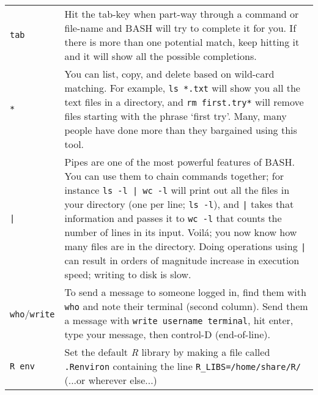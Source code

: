 \documentclass[12pt]{report}
\begin{document}
\begin{tabular}{l p{14cm}}
  \texttt{tab} & Hit the tab-key when part-way through a command or file-name and BASH will try to complete it for you. If there is more than one potential match, keep hitting it and it will show all the possible completions.\\
  \texttt{*} & You can list, copy, and delete based on wild-card matching. For example, \texttt{ls *.txt} will show you all the text files in a directory, and \texttt{rm first.try*} will remove files starting with the phrase `first try'. Many, many people have done more than they bargained using this tool.\\
  \texttt{|} & Pipes are one of the most powerful features of BASH. You can use them to chain commands together; for instance \texttt{ls -l | wc -l} will print out all the files in your directory (one per line; \texttt{ls -l}), and \texttt{|} takes that information and passes it to \texttt{wc -l} that counts the number of lines in its input. Voil\'{a}; you now know how many files are in the directory. Doing operations using \texttt{|} can result in orders of magnitude increase in execution speed; writing to disk is slow.\\
  \texttt{who}/\texttt{write} & To send a message to someone logged in, find them with \texttt{who} and note their terminal (second column). Send them a message with \texttt{write username terminal}, hit enter, type your message, then control-D (end-of-line).\\
\texttt{R env} & Set the default \emph{R} library by making a file called \texttt{.Renviron} containing the line \texttt{R\_LIBS=/home/share/R/} (...or wherever else...)\\
  \hline
  \end{tabular}
\end{document}
